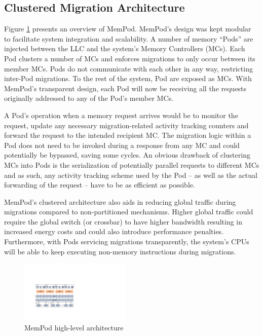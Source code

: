 \subsection{Clustered Migration Architecture}

 Figure \ref{fig:architecture_complete} presents an overview of MemPod. MemPod's design was kept modular to facilitate system integration and scalability. A number of memory ``Pods'' are injected between the LLC and the system's Memory Controllers (MCs). Each Pod clusters a number of MCs and enforces migrations to only occur between its member MCs. Pods do not communicate with each other in any way, restricting inter-Pod migrations. To the rest of the system, Pod are exposed as MCs. With MemPod's transparent design, each Pod will now be receiving all the requests originally addressed to any of the Pod's member MCs. 

A Pod's operation when a memory request arrives would be to monitor the request, update any necessary migration-related activity tracking counters and forward the request to the intended recipient MC. The migration logic within a Pod does not need to be invoked during a response from any MC and could potentially be bypassed, saving some cycles. An obvious drawback of clustering MCs into Pods is the serialization of potentially parallel requests to different MCs and as such, any activity tracking scheme used by the Pod -- as well as the actual forwarding of the request -- have to be as efficient as possible. 

MemPod's clustered architecture also aids in reducing global traffic during migrations compared to non-partitioned mechanisms. Higher global traffic could require the global switch (or crossbar) to have higher bandwidth resulting in increased energy costs and could also introduce performance penalties. Furthermore, with Pods servicing migrations transparently, the system's CPUs will be able to keep executing non-memory instructions during migrations. 

\begin{figure}[h]
  \includegraphics[width=0.47\textwidth]{figures/mempod_org.pdf}
  \caption{MemPod high-level architecture}
  \label{fig:architecture_complete}
\end{figure}


